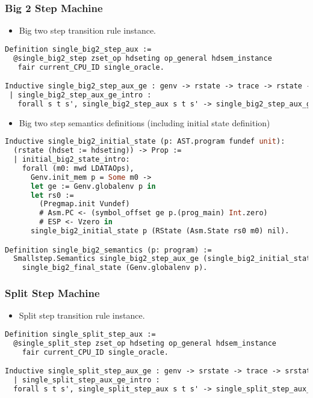 \subsubsection{Big 2 Step Machine}
\begin{itemize}[leftmargin=*]
\item Big two step transition rule instance.
\end{itemize}
\begin{lstlisting}[language=Caml]
Definition single_big2_step_aux :=
  @single_big2_step zset_op hdseting op_general hdsem_instance 
   fair current_CPU_ID single_oracle.

Inductive single_big2_step_aux_ge : genv -> rstate -> trace -> rstate -> Prop :=
 | single_big2_step_aux_ge_intro : 
   forall s t s', single_big2_step_aux s t s' -> single_big2_step_aux_ge ge s t s'.
\end{lstlisting}


\begin{itemize}[leftmargin=*]
\item Big two step semantics definitions (including initial state definition)
\end{itemize}
\begin{lstlisting}[language=Caml]
Inductive single_big2_initial_state (p: AST.program fundef unit): 
  (rstate (hdset := hdseting)) -> Prop :=
  | initial_big2_state_intro: 
    forall (m0: mwd LDATAOps),
      Genv.init_mem p = Some m0 ->
      let ge := Genv.globalenv p in
      let rs0 :=
        (Pregmap.init Vundef)
        # Asm.PC <- (symbol_offset ge p.(prog_main) Int.zero)
        # ESP <- Vzero in
      single_big2_initial_state p (RState (Asm.State rs0 m0) nil).

Definition single_big2_semantics (p: program) :=
  Smallstep.Semantics single_big2_step_aux_ge (single_big2_initial_state p) 
    single_big2_final_state (Genv.globalenv p).
\end{lstlisting}

\subsubsection{Split Step Machine}
\begin{itemize}[leftmargin=*]
\item Split step transition rule instance.
\end{itemize}
\begin{lstlisting}[language=Caml]
Definition single_split_step_aux :=
  @single_split_step zset_op hdseting op_general hdsem_instance 
    fair current_CPU_ID single_oracle.

Inductive single_split_step_aux_ge : genv -> srstate -> trace -> srstate -> Prop :=
  | single_split_step_aux_ge_intro : 
  forall s t s', single_split_step_aux s t s' -> single_split_step_aux_ge ge s t s'.
\end{lstlisting}


